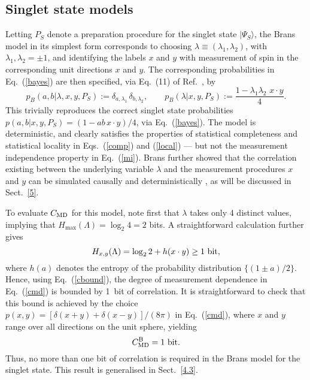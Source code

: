 \documentclass[graybox]{svmult}
\begin{document}
\subsection{Singlet state models}
\label{4.2}

 Letting $P_S$ denote a preparation procedure for the singlet state $|\Psi_S\rangle$, the Brans model in its simplest form corresponds to choosing $\lambda\equiv (\lambda_1,\lambda_2)$, with $\lambda_1,\lambda_2=\pm1$, and identifying the labels $x$ and $y$ with measurement of spin in the corresponding unit directions $x$ and $y$.  The corresponding probabilities in Eq.~(\ref{bayes}) are then specified, via Eq.~(11) of Ref.~\cite{brans}, by
\begin{equation} \label{brans}
p_B(a,b|\lambda,x,y,P_S) :=\delta_{a,\lambda_1} \, \delta_{b,\lambda_2},\qquad p_B(\lambda|x,y,P_S):=\frac{1-\lambda_1\lambda_2 \,\,x \cdot y}{4} .
\end{equation}
This trivially reproduces the correct singlet state probabilities $p(a,b|x,y,P_S) = (1-ab\,x\cdot y)/4$, via Eq.~(\ref{bayes}). The model is deterministic, and clearly satisfies the properties of statistical completeness and statistical locality in Eqs.~(\ref{comp}) and (\ref{local}) --- but not the measurement independence property in Eq.~(\ref{mi}). Brans further showed that the correlation existing between the underlying variable $\lambda$ and the measurement procedures $x$ and $y$ can be simulated causally and deterministically \cite{brans}, as will be discussed in Sect.~\ref{5}.


To evaluate $C_{\rm MD}$ for this model, note first that $\lambda$ takes only 4 distinct values, implying that
 $H_{\max}(\Lambda)=\log_2 4 =2$ bits.  A straightforward calculation further gives
\[ H_{x,y}(\Lambda) = \log_2 2 +h(x\cdot y) \geq 1~{\rm bit}, \]
where $h(a)$ denotes the entropy of the probability distribution $\{(1\pm a)/2\}$.
Hence, using Eq.~(\ref{cbound}), the degree of measurement dependence in Eq.~(\ref{cmd}) is bounded by 1~bit of correlation.  It is straightforward to check that this bound is achieved by the choice $p(x,y)=[\delta(x+y)+\delta(x-y)]/(8\pi)$ in Eq.~(\ref{cmd}), where $x$ and $y$ range over all directions on the unit sphere, yielding
\begin{equation} \label{cdb}
C^{\rm B}_{\rm MD} = 1~{\rm bit}.
\end{equation}
Thus, no more than one bit of correlation is required in the Brans model for the singlet state.  This result is generalised in Sect.~\ref{4.3}.
\end{document}
